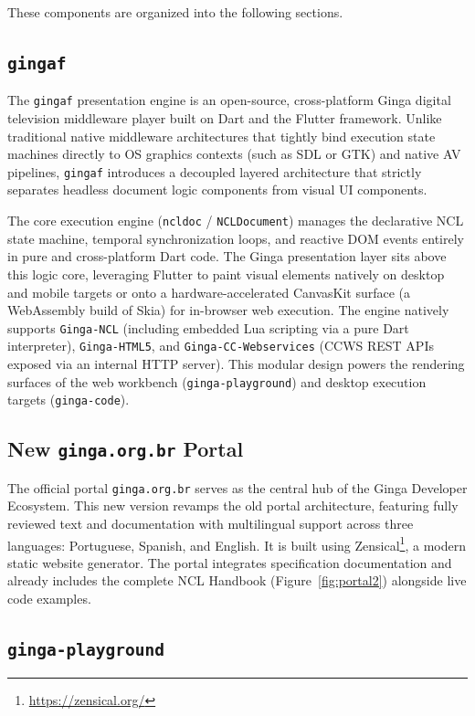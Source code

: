\documentclass[sigconf,authorversion,review,authordraft]{webmedia}
\begin{document}
These components are organized into the following sections.

\subsection{\texttt{gingaf}}

The \texttt{gingaf} presentation engine is an open-source, cross-platform Ginga digital television middleware player built on Dart and the Flutter framework. Unlike traditional native middleware architectures that tightly bind execution state machines directly to OS graphics contexts (such as SDL or GTK) and native AV pipelines, \texttt{gingaf} introduces a decoupled layered architecture that strictly separates headless document logic components from visual UI components.

The core execution engine (\texttt{ncldoc} / \texttt{NCLDocument}) manages the declarative NCL state machine, temporal synchronization loops, and reactive DOM events entirely in pure and cross-platform Dart code. The Ginga presentation layer sits above this logic core, leveraging Flutter to paint visual elements natively on desktop and mobile targets or onto a hardware-accelerated CanvasKit surface (a WebAssembly build of Skia) for in-browser web execution. The engine natively supports \texttt{Ginga-NCL} (including embedded Lua scripting via a pure Dart interpreter), \texttt{Ginga-HTML5}, and \texttt{Ginga-CC-Webservices} (CCWS REST APIs exposed via an internal HTTP server). This modular design powers the rendering surfaces of the web workbench (\texttt{ginga-playground}) and desktop execution targets (\texttt{ginga-code}).

\subsection{New \texttt{ginga.org.br} Portal}

The official portal \texttt{ginga.org.br} serves as the central hub of the Ginga Developer Ecosystem. This new version revamps the old portal architecture, featuring fully reviewed text and documentation with multilingual support across three languages: Portuguese, Spanish, and English. It is built using Zensical\footnote{\url{https://zensical.org/}}, a modern static website generator. The portal integrates specification documentation and already includes the complete NCL Handbook (Figure~\ref{fig:portal2}) alongside live code examples.

\subsection{\texttt{ginga-playground}}
\end{document}

